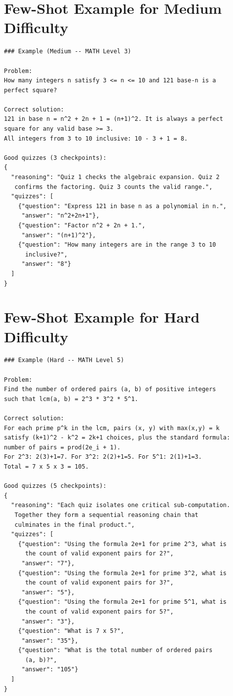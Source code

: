 \documentclass[12pt]{report}
\begin{document}
\section{Few-Shot Example for Medium Difficulty}
\label{app:fewshot-medium}

\begin{lstlisting}
### Example (Medium -- MATH Level 3)

Problem:
How many integers n satisfy 3 <= n <= 10 and 121 base-n is a
perfect square?

Correct solution:
121 in base n = n^2 + 2n + 1 = (n+1)^2. It is always a perfect
square for any valid base >= 3.
All integers from 3 to 10 inclusive: 10 - 3 + 1 = 8.

Good quizzes (3 checkpoints):
{
  "reasoning": "Quiz 1 checks the algebraic expansion. Quiz 2
   confirms the factoring. Quiz 3 counts the valid range.",
  "quizzes": [
    {"question": "Express 121 in base n as a polynomial in n.",
     "answer": "n^2+2n+1"},
    {"question": "Factor n^2 + 2n + 1.",
     "answer": "(n+1)^2"},
    {"question": "How many integers are in the range 3 to 10
      inclusive?",
     "answer": "8"}
  ]
}
\end{lstlisting}


\section{Few-Shot Example for Hard Difficulty}
\label{app:fewshot-hard}

\begin{lstlisting}
### Example (Hard -- MATH Level 5)

Problem:
Find the number of ordered pairs (a, b) of positive integers
such that lcm(a, b) = 2^3 * 3^2 * 5^1.

Correct solution:
For each prime p^k in the lcm, pairs (x, y) with max(x,y) = k
satisfy (k+1)^2 - k^2 = 2k+1 choices, plus the standard formula:
number of pairs = prod(2e_i + 1).
For 2^3: 2(3)+1=7. For 3^2: 2(2)+1=5. For 5^1: 2(1)+1=3.
Total = 7 x 5 x 3 = 105.

Good quizzes (5 checkpoints):
{
  "reasoning": "Each quiz isolates one critical sub-computation.
   Together they form a sequential reasoning chain that
   culminates in the final product.",
  "quizzes": [
    {"question": "Using the formula 2e+1 for prime 2^3, what is
      the count of valid exponent pairs for 2?",
     "answer": "7"},
    {"question": "Using the formula 2e+1 for prime 3^2, what is
      the count of valid exponent pairs for 3?",
     "answer": "5"},
    {"question": "Using the formula 2e+1 for prime 5^1, what is
      the count of valid exponent pairs for 5?",
     "answer": "3"},
    {"question": "What is 7 x 5?",
     "answer": "35"},
    {"question": "What is the total number of ordered pairs
      (a, b)?",
     "answer": "105"}
  ]
}
\end{lstlisting}
\end{document}
